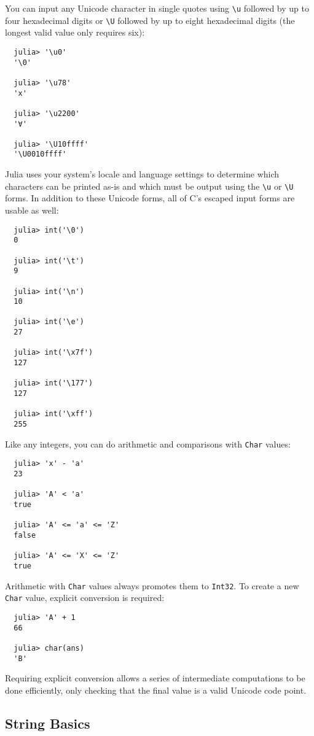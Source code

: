 \documentclass{article}
\begin{document}
You can input any Unicode character in single quotes using \verb|\u| followed by up to four hexadecimal digits or \verb|\U| followed by up to eight hexadecimal digits (the longest valid value only requires six):
\begin{verbatim}
  julia> '\u0'
  '\0'

  julia> '\u78'
  'x'

  julia> '\u2200'
  '∀'

  julia> '\U10ffff'
  '\U0010ffff'
\end{verbatim}
Julia uses your system's locale and language settings to determine which characters can be printed as-is and which must be output using the \verb|\u| or \verb|\U| forms.
In addition to these Unicode forms, all of C's escaped input forms are usable as well:
\begin{verbatim}
  julia> int('\0')
  0

  julia> int('\t')
  9

  julia> int('\n')
  10

  julia> int('\e')
  27

  julia> int('\x7f')
  127

  julia> int('\177')
  127

  julia> int('\xff')
  255
\end{verbatim}
Like any integers, you can do arithmetic and comparisons with \verb|Char| values:
\begin{verbatim}
  julia> 'x' - 'a'
  23

  julia> 'A' < 'a'
  true

  julia> 'A' <= 'a' <= 'Z'
  false

  julia> 'A' <= 'X' <= 'Z'
  true
\end{verbatim}
Arithmetic with \verb|Char| values always promotes them to \verb|Int32|.
To create a new \verb|Char| value, explicit conversion is required:
\begin{verbatim}
  julia> 'A' + 1
  66

  julia> char(ans)
  'B'
\end{verbatim}
Requiring explicit conversion allows a series of intermediate computations to be done efficiently, only checking that the final value is a valid Unicode code point.

\subsection{String Basics}
\end{document}
